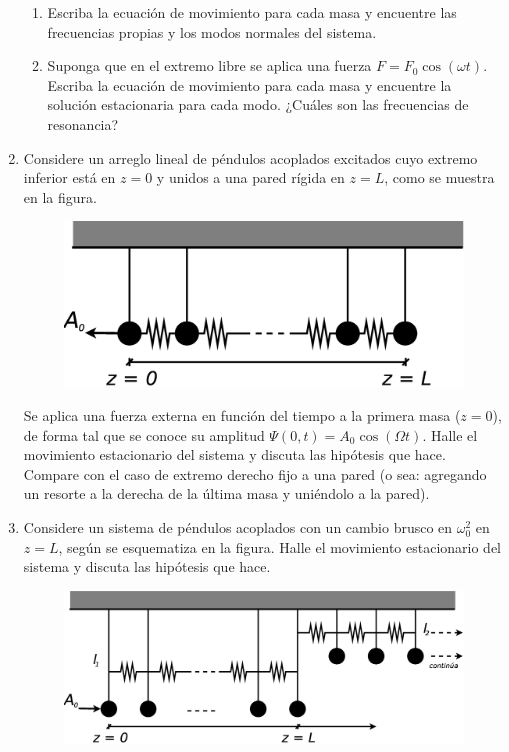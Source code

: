 \documentclass[11pt,spanish,a4paper]{article}
\begin{document}
\begin{enumerate}
\begin{enumerate}
\item Escriba la ecuación de movimiento para cada masa y encuentre las frecuencias
propias y los modos normales del sistema. 
\item Suponga que en el extremo libre se aplica una fuerza $F=F_{0}\cos(\omega t)$.
Escriba la ecuación de movimiento para cada masa y encuentre la solución
estacionaria para cada modo. ¿Cuáles son las frecuencias de resonancia?
\end{enumerate}



\item Considere un arreglo lineal de péndulos acoplados excitados cuyo extremo
inferior está en $z=0$ y unidos a una pared rígida en $z=L$, como
se muestra en la figura.
\begin{figure}[H]
\centering{}\includegraphics[clip,scale=0.25]{ej1-15}
\end{figure}
 Se aplica una fuerza externa en función del tiempo a la primera masa
($z=0$), de forma tal que se conoce su amplitud $\Psi(0,t)=A_{0}\cos(\Omega t)$.
Halle el movimiento estacionario del sistema y discuta las hipótesis
que hace. Compare con el caso de extremo derecho fijo a una pared
(o sea: agregando un resorte a la derecha de la última masa y uniéndolo
a la pared). 
\item Considere un sistema de péndulos acoplados con un cambio brusco en
$\omega_{0}^{2}$ en $z=L$, según se esquematiza en la figura. Halle
el movimiento estacionario del sistema y discuta las hipótesis que
hace.
\begin{figure}[H]
\centering{}\includegraphics[clip,scale=0.25]{ej1-16}
\end{figure}



\end{enumerate}
\end{document}
